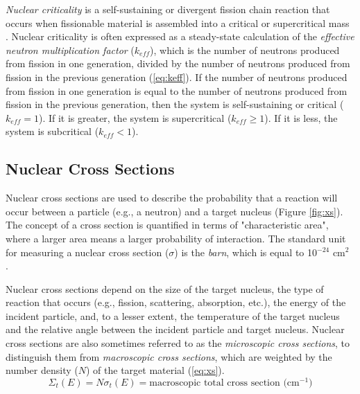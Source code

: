 
\textit{Nuclear criticality} is a self-sustaining or divergent fission chain reaction that occurs when fissionable material is assembled into a critical or supercritical mass \cite{knief}. 
Nuclear criticality is often expressed as a steady-state calculation of the \textit{effective neutron multiplication factor} ($k_{eff}$), which is the number of neutrons produced from fission in one generation, divided by the number of neutrons produced from fission in the previous generation (\ref{eq:keff}).
If the number of neutrons produced from fission in one generation is equal to the number of neutrons produced from fission in the previous generation, then the system is self-sustaining or critical ($k_{eff} = 1$).
If it is greater, the system is supercritical ($k_{eff} \geq 1$).
If it is less, the system is subcritical ($k_{eff} < 1$).


\subsection{Nuclear Cross Sections}

Nuclear cross sections are used to describe the probability that a reaction will occur between a particle (e.g., a neutron) and a target nucleus (Figure \ref{fig:xs}).
The concept of a cross section is quantified in terms of "characteristic area", where a larger area means a larger probability of interaction.
The standard unit for measuring a nuclear cross section ($\sigma$) is the \textit{barn}, which is equal to 10$^{-24}$ cm$^{2}$ \cite{lamarsh}.

Nuclear cross sections depend on the size of the target nucleus, the type of reaction that occurs (e.g., fission, scattering, absorption, etc.), the energy of the incident particle, and, to a lesser extent, the temperature of the target nucleus and the relative angle between the incident particle and target nucleus.
Nuclear cross sections are also sometimes referred to as the \textit{microscopic cross sections}, to distinguish them from \textit{macroscopic cross sections}, which are weighted by the number density ($N$) of the target material (\ref{eq:xs}).
%
\begin{equation}
  \label{eq:xs}
  \Sigma_{t}(E) = N\sigma_{t}(E) = \mbox{macroscopic total cross section (cm$^{-1}$)}
\end{equation}

